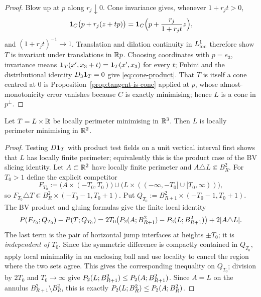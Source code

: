 \begin{proof}
Blow up at $p$ along $r_j\downarrow0$.  Cone invariance gives, whenever
$1+r_jt>0$,
\begin{equation}\label{eq:cone-rescale}
  \mathbf 1_{C}\bigl(p+r_j(z+tp)\bigr)
  =\mathbf 1_{C}\Bigl(p+\frac{r_j}{1+r_jt}z\Bigr),
\end{equation}
and $(1+r_jt)^{-1}\to1$.  Translation and dilation continuity in $L^1_{\mathrm{loc}}$
therefore show $T$ is invariant under translations in $\mathbb R p$.  Choosing
coordinates with $p=e_3$, invariance means
$\mathbf 1_{T}(x',x_3+t)=\mathbf 1_{T}(x',x_3)$ for every $t$; Fubini and the
distributional identity $D_3\mathbf 1_{T}=0$ give \eqref{eq:cone-product}.  That $T$
is itself a cone centred at $0$ is Proposition~\ref{prop:tangent-is-cone}
applied at $p$, whose almost-monotonicity error vanishes because $C$ is
exactly minimising; hence $L$ is a cone in $p^\perp$.
\end{proof}

\begin{lemma}\label{lem:cone-descent}
Let $T=L\times\mathbb R$ be locally perimeter minimising in $\mathbb R^3$.  Then $L$ is
locally perimeter minimising in $\mathbb R^2$.
\end{lemma}

\begin{proof}
Testing $D\mathbf 1_{T}$ with product test fields on a unit vertical interval first
shows that $L$ has locally finite perimeter; equivalently this is the product
case of the BV slicing identity.
Let $A\subset\mathbb R^2$ have locally finite perimeter and
$A\triangle L\Subset B_R^2$.  For $T_0>1$ define the explicit competitor
\begin{equation}\label{eq:product-competitor}
  F_{T_0}:=\bigl(A\times(-T_0,T_0)\bigr)
    \cup\bigl(L\times((-\infty,-T_0]\cup[T_0,\infty))\bigr),
\end{equation}
so $F_{T_0}\triangle T\Subset B_R^2\times(-T_0-1,T_0+1)$.  Put
$Q_{T_0}:=B_{R+1}^2\times(-T_0-1,T_0+1)$.  The BV product and gluing formulas
give the finite local identity
\begin{equation}\label{eq:product-perimeter}
  P(F_{T_0};Q_{T_0})-P(T;Q_{T_0})
  =2T_0\bigl(P_2(A;B^2_{R+1})-P_2(L;B^2_{R+1})\bigr)
    +2|A\triangle L| .
\end{equation}
The last term is the pair of horizontal jump interfaces at heights $\pm T_0$;
it is \emph{independent of $T_0$}.  Since the symmetric difference is
compactly contained in $Q_{T_0}$, apply local minimality in an enclosing ball
and use locality to cancel the region where the two sets agree.  This gives
the corresponding inequality on $Q_{T_0}$; division by $2T_0$ and
$T_0\to\infty$ give
$P_2(L;B^2_{R+1})\le P_2(A;B^2_{R+1})$.  Since $A=L$ on the annulus
$B^2_{R+1}\setminus B^2_R$, this is exactly
$P_2(L;B^2_R)\le P_2(A;B^2_R)$.
\end{proof}

